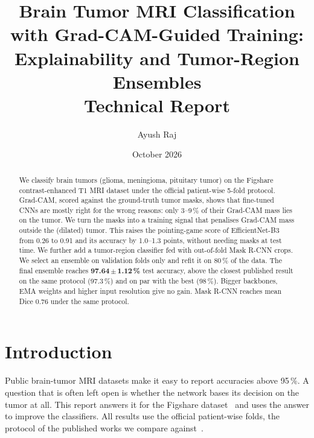 \documentclass[11pt,a4paper]{article}
\title{\textbf{Brain Tumor MRI Classification with Grad-CAM-Guided Training:\\
Explainability and Tumor-Region Ensembles}\\[4pt]
\large Technical Report}
\author{Ayush Raj}
\date{October 2026}
\newcommand{\best}[1]{\textbf{#1}}
\begin{document}
\maketitle

\begin{abstract}
\noindent
We classify brain tumors (glioma, meningioma, pituitary tumor) on the Figshare contrast-enhanced T1 MRI dataset under
the official patient-wise 5-fold protocol. Grad-CAM, scored against the ground-truth tumor masks, shows that
fine-tuned CNNs are mostly right for the wrong reasons: only 3--9\,\% of their Grad-CAM mass lies on the tumor. We turn
the masks into a training signal that penalises Grad-CAM mass outside the (dilated) tumor. This raises the pointing-game
score of EfficientNet-B3 from 0.26 to 0.91 and its accuracy by 1.0--1.3 points, without needing masks at test time. We
further add a tumor-region classifier fed with out-of-fold Mask R-CNN crops. We select an ensemble on validation folds
only and refit it on 80\,\% of the data. The final ensemble reaches \best{97.64\,$\pm$\,1.12\,\%} test accuracy,
above the closest published result on the same protocol (97.3\,\%) and on par with the best (98\,\%). Bigger
backbones, EMA weights and higher input resolution give no gain. Mask R-CNN reaches mean Dice 0.76 under the same
protocol.
\end{abstract}

\tableofcontents
\bigskip

\section{Introduction}

Public brain-tumor MRI datasets make it easy to report accuracies above 95\,\%. A question that is often left open is
whether the network bases its decision on the tumor at all. This report answers it for the Figshare
dataset~\cite{figshare,cheng2015} and uses the answer to improve the classifiers. All results use the official
patient-wise folds, the protocol of the published works we compare against~\cite{cheng2015,deepak2019,diazpernas2021}.
\end{document}
